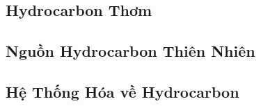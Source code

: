 \documentclass{article}
\numberwithin{equation}{section}
\begin{document}

\subsection{Hydrocarbon Thơm}


\subsection{Nguồn Hydrocarbon Thiên Nhiên}


\subsection{Hệ Thống Hóa về Hydrocarbon}


\printbibliography[heading=bibintoc]
	
\end{document}
